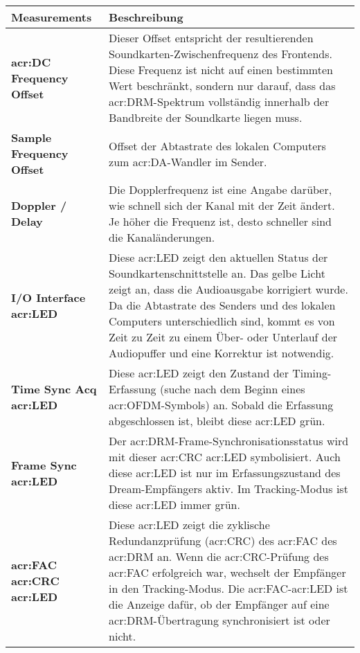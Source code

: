 \begin{table}[h]
	\begin{center}
		\begin{tabular}{p{0.28\linewidth}  p{0.72\linewidth}}	
			\toprule
			\textbf{Measurements} & \textbf{Beschreibung} \\
			\midrule
			\textbf{\gls{acr:DC} Frequency Offset} & Dieser Offset entspricht der resultierenden Soundkarten-Zwischenfrequenz des Frontends. Diese Frequenz ist nicht auf einen bestimmten Wert beschränkt, sondern nur darauf, dass das \gls{acr:DRM}-Spektrum vollständig innerhalb der Bandbreite der Soundkarte liegen muss.\\
			
			\textbf{Sample Frequency Offset} & Offset der Abtastrate des lokalen Computers zum \gls{acr:DA}-Wandler im Sender. \\
			
			\textbf{Doppler / Delay} & Die Dopplerfrequenz ist eine Angabe darüber, wie schnell sich der Kanal mit der Zeit ändert. Je höher die Frequenz ist, desto schneller sind die Kanaländerungen. \\
			
			\textbf{I/O Interface \gls{acr:LED}} & Diese \gls{acr:LED} zeigt den aktuellen Status der Soundkartenschnittstelle an. Das gelbe Licht zeigt an, dass die Audioausgabe korrigiert wurde. Da die Abtastrate des Senders und des lokalen Computers unterschiedlich sind, kommt es von Zeit zu Zeit zu einem Über- oder Unterlauf der Audiopuffer und eine Korrektur ist notwendig.\\
			
			\textbf{Time Sync Acq \gls{acr:LED}} &Diese \gls{acr:LED} zeigt den Zustand der Timing-Erfassung (suche nach dem Beginn eines \gls{acr:OFDM}-Symbols) an. Sobald die Erfassung abgeschlossen ist, bleibt diese \gls{acr:LED} grün.	\\
			
			\textbf{Frame Sync \gls{acr:LED}} & Der \gls{acr:DRM}-Frame-Synchronisationsstatus wird mit dieser \gls{acr:CRC} \gls{acr:LED} symbolisiert. Auch diese \gls{acr:LED} ist nur im Erfassungszustand des Dream-Empfängers aktiv. Im Tracking-Modus ist diese \gls{acr:LED} immer grün.\\
			
			\textbf{\gls{acr:FAC} \gls{acr:CRC} \gls{acr:LED}} & Diese \gls{acr:LED} zeigt die zyklische Redundanzprüfung (\gls{acr:CRC}) des \gls{acr:FAC} des \gls{acr:DRM} an. Wenn die \gls{acr:CRC}-Prüfung des \gls{acr:FAC} erfolgreich war, wechselt der Empfänger in den Tracking-Modus. Die \gls{acr:FAC}-\gls{acr:LED} ist die Anzeige dafür, ob der Empfänger auf eine \gls{acr:DRM}-Übertragung synchronisiert ist oder nicht. \\
			

\end{tabular}
\end{center}
\end{table}

